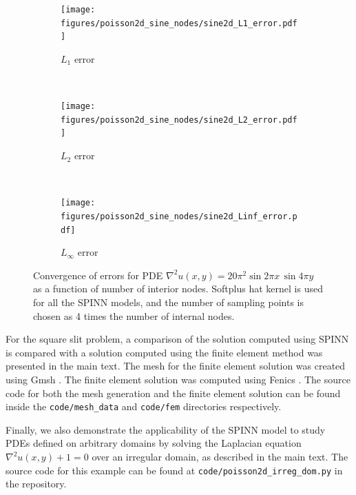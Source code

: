 \documentclass[12pt]{article}
\begin{document}
\begin{figure}
\begin{subfigure}{0.32\textwidth}
\centering
\texttt{[image: figures/poisson2d\_sine\_nodes/sine2d\_L1\_error.pdf]}
\caption{$L_1$ error}
\label{fig:2d_A_L1}
\end{subfigure}
~
\begin{subfigure}{0.32\textwidth}
\centering
\texttt{[image: figures/poisson2d\_sine\_nodes/sine2d\_L2\_error.pdf]}
\caption{$L_2$ error}
\label{fig:2d_A_L2}
\end{subfigure}
~
\begin{subfigure}{0.32\textwidth}
\centering
\texttt{[image: figures/poisson2d\_sine\_nodes/sine2d\_Linf\_error.pdf]}
\caption{$L_{\infty}$ error}
\label{fig:2d_A_Linf_a}
\end{subfigure}
\caption{Convergence of errors for PDE $\nabla^2 u(x, y) = 20\pi^2 \sin 2\pi x \, \sin 4 \pi y$ as a function of number of interior nodes. Softplus hat kernel is used for all the SPINN models, and the number of sampling points is chosen as 4 times the number of internal nodes.}
\label{fig:sine2d_errors}
\end{figure}

For the square slit problem, a comparison of the solution computed using SPINN is compared with a solution computed using the finite element method was presented in the main text. The mesh for the finite element solution was created using Gmsh \cite{gmsh}. The finite element solution was computed using Fenics \cite{AlnaesBlechta2015a, LoggMardalEtAl2012a}. The source code for both the mesh generation and the finite element solution can be found inside the \verb|code/mesh_data| and \verb|code/fem| directories respectively.

Finally, we also demonstrate the applicability of the SPINN model to study PDEs defined on arbitrary domains by solving the Laplacian equation $\nabla^2 u(x,y) + 1 = 0$ over an irregular domain, as described in the main text. The source code for this example can be found at  \verb|code/poisson2d_irreg_dom.py| in the repository.
\end{document}
